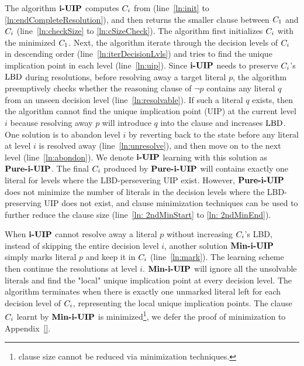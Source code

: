 The algorithm $\textbf{i-UIP}$ computes $C_{i}$ from (line~\ref{ln:init} to \ref{ln:endCompleteResolution}), and then returns the smaller clause between 
$C_{1}$ and $C_{i}$ (line~\ref{ln:checkSize} to \ref{ln:cSizeCheck}). 
The algorithm first initializes $C_{i}$ with the minimized\cite{} $C_{1}$. Next, the algorithm iterate through the decision levels of $C_{i}$ in descending order (line~\ref{ln:iterDecisionLvls}) and tries to find the unique implication point in each level (line~\ref{ln:uip}). Since $\textbf{i-UIP}$ needs to preserve $C_{i}$'s $\text{LBD}$ during resolutions, before resolving away a target literal $p$, the algorithm preemptively checks whether the reasoning clause of $\neg{p}$ contains any literal $q$ from an unseen decision level (line~\ref{ln:resolvable}). If such a literal $q$ exists, then the algorithm cannot find the unique implication point (UIP) at the current level $i$ because resolving away $p$ will introduce $q$ into the clause and increases $\text{LBD}$. One solution is to abandon level $i$ by reverting back to the state before any literal at level $i$ is resolved away (line~\ref{ln:unresolve}), and then move on to the next level (line~\ref{ln:abondon}). We denote $\textbf{i-UIP}$ learning with this solution as $\textbf{Pure-i-UIP}$. The final $C_{i}$ produced by $\textbf{Pure-i-UIP}$ will contains exactly one literal for levels where the LBD-persevering UIP exist. However, $\textbf{Pure-i-UIP}$ does not minimize the number of literals in the decision levels where the LBD-preserving UIP does not exist, and clause minimization techniques\cite{} can be used to further reduce the clause size (line~\ref{ln: 2ndMinStart} to \ref{ln: 2ndMinEnd}). 

  When $\textbf{i-UIP}$ cannot resolve away a literal $p$ without increasing $C_{i}$'s LBD, instead of skipping the entire decision level $i$, another solution $\textbf{Min-i-UIP}$  simply marks literal $p$ and keep it  in $C_{i}$ (line~\ref{ln:mark}). The learning scheme then continue the resolutions at level $i$. $\textbf{Min-i-UIP}$ will ignore all the unsolvable literals and find the "local" unique implication point at every decision level.  The algorithm terminates when there is exactly one unmarked literal left for each decision level of $C_{i}$, representing the local unique implication points. The clause $C_{i}$ learnt by
  $\textbf{Min-i-UIP}$ is minimized\footnote{clause size cannot be reduced via minimization techniques\cite{}.}, we defer the proof of minimization to Appendix~\ref{}.  

